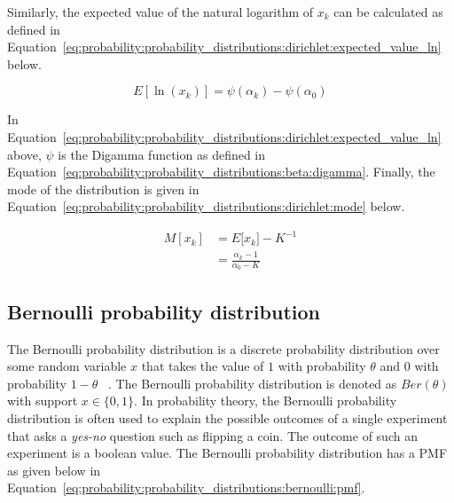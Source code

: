 Similarly, the expected value of the natural logarithm of $x_{k}$ can be calculated as defined in Equation~\eqref{eq:probability:probability_distributions:dirichlet:expected_value_ln} below.

\begin{equation}
      \label{eq:probability:probability_distributions:dirichlet:expected_value_ln}
      E[\ln(x_{k})] = \psi({\alpha_{k}}) - \psi(\alpha_{0})
\end{equation}

In Equation~\eqref{eq:probability:probability_distributions:dirichlet:expected_value_ln} above, $\psi$ is the Digamma function as defined in Equation~\eqref{eq:probability:probability_distributions:beta:digamma}. Finally, the mode of the distribution is given in Equation~\eqref{eq:probability:probability_distributions:dirichlet:mode} below.

\begin{equation}
      \label{eq:probability:probability_distributions:dirichlet:mode}
      \begin{split}
            M[x_{k}] &= E[{x_{k}] -K^{-1}} \\
            &=  \frac{\alpha_{k} - 1}{\alpha_{0} - K}
      \end{split}
\end{equation}


\subsection{Bernoulli probability distribution}\label{sec:probability:probability_distributions:bernoulli}

The Bernoulli probability distribution is a discrete probability distribution over some random variable $x$ that takes the value of $1$ with probability $\theta$ and $0$ with probability $1-\theta$ ~\cite{ref:wackerly:2014}. The Bernoulli probability distribution is denoted as $Ber(\theta)$ with support $x \in \{0, 1\}$. In probability theory, the Bernoulli probability distribution is often used to explain the possible outcomes of a single experiment that asks a \textit{yes-no} question such as flipping a coin. The outcome of such an experiment is a boolean value. The Bernoulli probability distribution has a \acf{PMF} as given below in Equation~\eqref{eq:probability:probability_distributions:bernoulli:pmf}.

